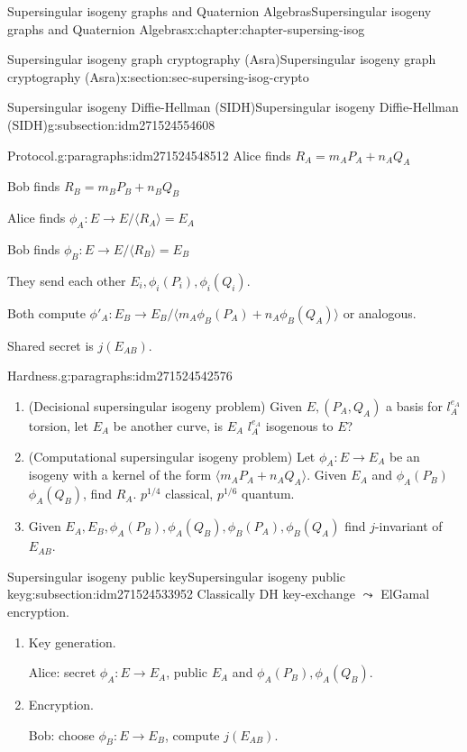 \documentclass[oneside,10pt,]{book}
\numberwithin{equation}{section}
\begin{document}
\begin{chapterptx}{Supersingular isogeny graphs and Quaternion Algebras}{}{Supersingular isogeny graphs and Quaternion Algebras}{}{}{x:chapter:chapter-supersing-isog}
\begin{sectionptx}{Supersingular isogeny graph cryptography (Asra)}{}{Supersingular isogeny graph cryptography (Asra)}{}{}{x:section:sec-supersing-isog-crypto}
\begin{subsectionptx}{Supersingular isogeny Diffie-Hellman (SIDH)}{}{Supersingular isogeny Diffie-Hellman (SIDH)}{}{}{g:subsection:idm271524554608}
\begin{paragraphs}{Protocol.}{g:paragraphs:idm271524548512}
Alice finds \(R_A = m_AP_A + n_AQ_A\)%
\par
Bob finds \(R_B = m_BP_B + n_BQ_B\)%
\par
Alice finds \(\phi_A \colon E \to E/\langle R_A\rangle = E_A\)%
\par
Bob finds \(\phi_B \colon E \to E/\langle R_B\rangle = E_B\)%
\par
They send each other \(E_i, \phi_i(P_i),\phi_i(Q_i)\).%
\par
Both compute \(\phi'_A\colon E_B \to E_B/\langle m_A\phi_B(P_A) + n_A\phi_B(Q_A)\rangle\) or analogous.%
\par
Shared secret is \(j(E_{AB})\).%
\end{paragraphs}%
\begin{paragraphs}{Hardness.}{g:paragraphs:idm271524542576}%
%
\begin{enumerate}
\item{}(Decisional supersingular isogeny problem) Given \(E, (P_A,Q_A)\) a basis for \(l_A^{e_A}\) torsion, let \(E_A\) be another curve, is \(E_A\) \(l_A^{e_A}\) isogenous to \(E\)?%
\item{}(Computational supersingular isogeny problem) Let \(\phi_A \colon E \to E_A\) be an isogeny with a kernel of the form \(\langle m_AP_A + n_AQ_A \rangle\). Given \(E_A\) and \(\phi_A(P_B)\) \(\phi_A(Q_B)\), find \(R_A\). \(p^{1/4}\) classical, \(p^{1/6}\) quantum.%
\item{}Given \(E_A, E_B, \phi_A(P_B), \phi_A(Q_B), \phi_B(P_A), \phi_B(Q_A)\) find \(j\)-invariant of \(E_{AB}\).%
\end{enumerate}
%
\end{paragraphs}%
\end{subsectionptx}
%
%
\typeout{************************************************}
\typeout{************************************************}
%
\begin{subsectionptx}{Supersingular isogeny public key}{}{Supersingular isogeny public key}{}{}{g:subsection:idm271524533952}
Classically DH key-exchange \(\leadsto\) ElGamal encryption.%
\par
%
\begin{enumerate}
\item{}Key generation.%
\par
Alice: secret \(\phi_A \colon E \to E_A\), public \(E_A\) and \(\phi_A(P_B), \phi_A(Q_B)\).%
\item{}Encryption.%
\par
Bob: choose \(\phi_B \colon E \to E_B\), compute \(j(E_{AB})\).%

\end{enumerate}
\end{subsectionptx}
\end{sectionptx}
\end{chapterptx}
\end{document}
